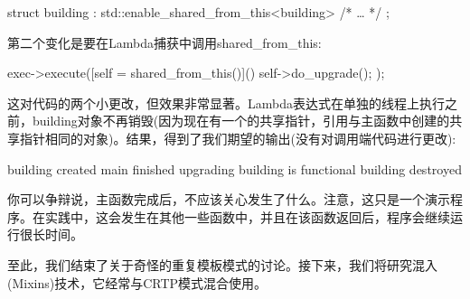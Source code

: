 \begin{cpp}
struct building : std::enable_shared_from_this<building>
{
	/* … */
};
\end{cpp}

第二个变化是要在Lambda捕获中调用shared\_from\_this:

\begin{cpp}
exec->execute([self = shared_from_this()]() {
	self->do_upgrade();
});
\end{cpp}

这对代码的两个小更改，但效果非常显著。Lambda表达式在单独的线程上执行之前，building对象不再销毁(因为现在有一个的共享指针，引用与主函数中创建的共享指针相同的对象)。结果，得到了我们期望的输出(没有对调用端代码进行更改):

\begin{shell}
building created
main finished
upgrading
building is functional
building destroyed
\end{shell}

你可以争辩说，主函数完成后，不应该关心发生了什么。注意，这只是一个演示程序。在实践中，这会发生在其他一些函数中，并且在该函数返回后，程序会继续运行很长时间。

至此，我们结束了关于奇怪的重复模板模式的讨论。接下来，我们将研究混入(Mixins)技术，它经常与CRTP模式混合使用。





















